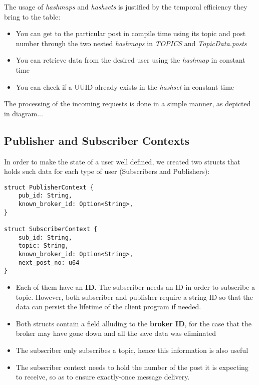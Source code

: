 The usage of \emph{hashmaps} and \emph{hashsets} is justified by the temporal efficiency they bring to the table:
    
\begin{itemize}
    \item You can get to the particular post in compile time using its topic and post number through the two nested \emph{hashmaps} in \emph{TOPICS} and \emph{TopicData.posts}  
    \item You can retrieve data from the desired user using the \emph{hashmap} in constant time
    \item You can check if a UUID already exists in the \emph{hashset} in constant time
\end{itemize}

The processing of the incoming requests is done in a simple manner, as depicted in diagram... %




\subsection{Publisher and Subscriber Contexts}

In order to make the state of a user well defined, we created two structs that holds such data for each type of user (Subscribers and Publishers):

\begin{lstlisting}
struct PublisherContext {
    pub_id: String,
    known_broker_id: Option<String>,
}

struct SubscriberContext {
    sub_id: String,
    topic: String,
    known_broker_id: Option<String>,
    next_post_no: u64
}
\end{lstlisting}

\begin{itemize}
    \item Each of them have an \textbf{ID}. The subscriber needs an ID in order to subscribe a topic. However, both subscriber and publisher require a string ID so that the data can persist the lifetime of the client program if needed. 
    \item Both structs contain a field alluding to the \textbf{broker ID}, for the case that the broker may have gone down and all the save data was eliminated
    \item The subscriber only subscribes a topic, hence this information is also useful
    \item The subscriber context needs to hold the number of the post it is expecting to receive, so as to ensure exactly-once message delivery.
\end{itemize}








